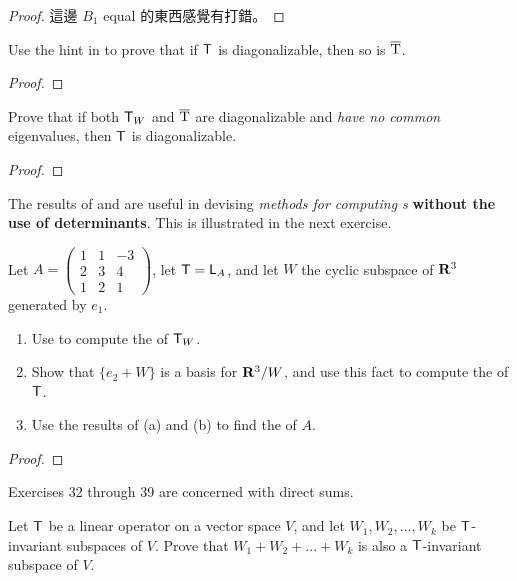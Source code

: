 \begin{proof}
這邊 \(B_1\) equal 的東西感覺有打錯。
\end{proof}

\begin{exercise} \label{exercise 5.4.29}
Use the hint in  to prove that if \(\textsf{T}\) is diagonalizable, then so is \(\mathrm{\overline{T}}\).
\end{exercise}

\begin{proof}
\end{proof}

\begin{exercise} \label{exercise 5.4.30}
Prove that if both \(\textsf{T}_W\) and \(\mathrm{\overline{T}}\) are diagonalizable and \emph{have no common} eigenvalues, then \(\textsf{T}\) is diagonalizable.
\end{exercise}

\begin{proof}
\end{proof}

The results of  and  are useful in devising \emph{methods for computing \CPOLY{}s} \textbf{without the use of determinants}.
This is illustrated in the next exercise.

\begin{exercise} \label{exercise 5.4.31}
Let \(A = \begin{pmatrix} 1 & 1 & -3 \\ 2 & 3 & 4 \\ 1 & 2 & 1 \end{pmatrix}\), let \(\textsf{T} = \textsf{L}_A\), and let \(W\) the cyclic subspace of \(\mathbf{R}^3\) generated by \(e_1\).

\begin{enumerate}
\item Use  to compute the \CPOLY{} of \(\textsf{T}_W\).
\item Show that \(\{ e_2 + W \}\) is a basis for \(\mathbf{R}^3/W\), and use this fact to compute the \CPOLY{} of \(\textsf{T}\).
\item Use the results of (a) and (b) to find the \CPOLY{} of \(A\).
\end{enumerate}
\end{exercise}

\begin{proof}
\end{proof}

Exercises 32 through 39 are concerned with direct sums.

\begin{exercise} \label{exercise 5.4.32}
Let \(\textsf{T}\) be a linear operator on a vector space \(V\), and let \(W_1, W_2 , ..., W_k\) be \(\textsf{T}\)-invariant subspaces of \(V\).
Prove that \(W_1 + W_2 + ... + W_k\) is also a \(\textsf{T}\)-invariant subspace of \(V\).
\end{exercise}

